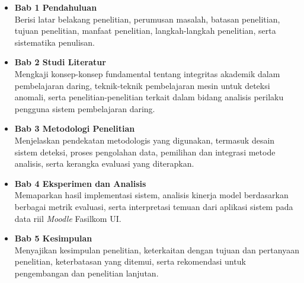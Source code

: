 \begin{itemize}
\item \textbf{Bab 1 Pendahuluan}\\
Berisi latar belakang penelitian, perumusan masalah, batasan penelitian, tujuan penelitian, manfaat penelitian, langkah-langkah penelitian, serta sistematika penulisan.

\item \textbf{Bab 2 Studi Literatur}\\
Mengkaji konsep-konsep fundamental tentang integritas akademik dalam pembelajaran daring, teknik-teknik pembelajaran mesin untuk deteksi anomali, serta penelitian-penelitian terkait dalam bidang analisis perilaku pengguna sistem pembelajaran daring.

\item \textbf{Bab 3 Metodologi Penelitian}\\
Menjelaskan pendekatan metodologis yang digunakan, termasuk desain sistem deteksi, proses pengolahan data, pemilihan dan integrasi metode analisis, serta kerangka evaluasi yang diterapkan.

\item \textbf{Bab 4 Eksperimen dan Analisis}\\
Memaparkan hasil implementasi sistem, analisis kinerja model berdasarkan berbagai metrik evaluasi, serta interpretasi temuan dari aplikasi sistem pada data riil \textit{Moodle} Fasilkom UI.

\item \textbf{Bab 5 Kesimpulan}\\
Menyajikan kesimpulan penelitian, keterkaitan dengan tujuan dan pertanyaan penelitian, keterbatasan yang ditemui, serta rekomendasi untuk pengembangan dan penelitian lanjutan.
\end{itemize}

